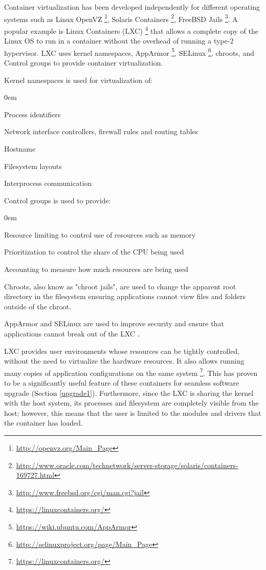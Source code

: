 \documentclass[a4paper,11pt,twoside]{article}
\begin{document}
\noindent
Container virtualization has been developed independently for different operating systems such as Linux OpenVZ \footnote{\url{http://openvz.org/Main_Page}}, Solaris Containers \footnote{\url{http://www.oracle.com/technetwork/server-storage/solaris/containers-169727.html}}, FreeBSD Jails \footnote{\url{http://www.freebsd.org/cgi/man.cgi?jail}}. A popular example is Linux Containers (LXC) \footnote{\label{LCX} \url{https://linuxcontainers.org/}} that allows a complete copy of the Linux OS to run in a container without the overhead of running a type-2 hypervisor. LXC uses kernel namespaces, AppArmor \footnote{\url{https://wiki.ubuntu.com/AppArmor}}, SELinux \footnote{\url{http://selinuxproject.org/page/Main_Page}}, chroots, and Control groups to provide container virtualization. 

\noindent
Kernel namespaces is used for virtualization of:

\begin{list}{-}{}
  \itemsep0em
  \item Process identifiers
  \item Network interface controllers, firewall rules and routing tables
  \item Hostname
  \item Filesystem layouts 
  \item Interprocess communication
  \end{list}

\noindent 
Control groups is used to provide:

\begin{list}{-}{}
  \itemsep0em
  \item Resource limiting to control use of resources such as memory
  \item Prioritization to control the share of the CPU being used
  \item Accounting to measure how much resources are being used
  \end{list}

\noindent
Chroots, also know as "chroot jails", are used to change the apparent root directory in the filesystem ensuring applications cannot view files and folders outside of the chroot.

AppArmor and SELinux are used to improve security and ensure that applications cannot break out of the LXC \cite{security}.

LXC provides user environments whose resources can be tightly controlled, without the need to virtualize the hardware resources. It also allows running many copies of application configurations on the same system \footnote{\url{https://linuxcontainers.org/}}. This has proven to be a significantly useful feature of these containers for seamless software upgrade (Section \ref{upgrade1}). Furthermore, since the LXC is sharing the kernel with the host system, its processes and filesystem are completely visible from the host; however, this means that the user is limited to the modules and drivers that the container has loaded. \bigskip
\end{document}
